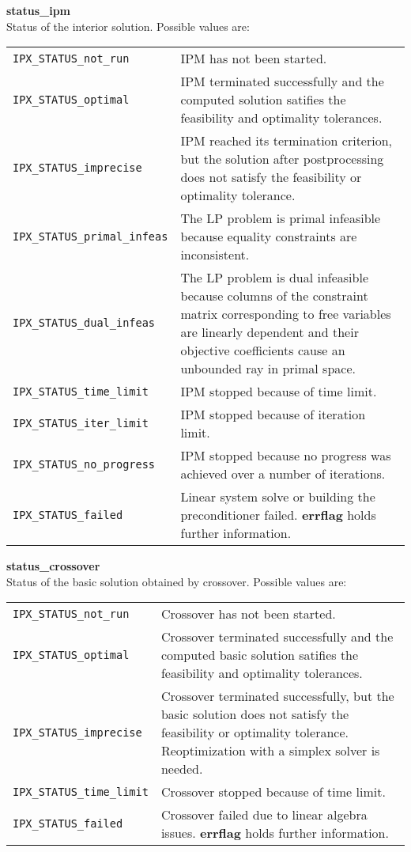 \documentclass{article}
\newcommand{\ct}{\texttt}
\newcommand{\info}[2]{
  \noindent\begin{minipage}{\textwidth}
    \textbf{#1}\\
    #2
  \end{minipage}
  \vskip 1\baselineskip
}
\begin{document}
\info{status\_ipm}{
  Status of the interior solution. Possible values are:\\[1em]
  \begin{tabular}{lp{8cm}}
    \ct{IPX\_STATUS\_not\_run} & IPM has not been started.\\
    \ct{IPX\_STATUS\_optimal} & IPM terminated successfully and the computed
    solution satifies the feasibility and optimality tolerances.\\
    \ct{IPX\_STATUS\_imprecise} & IPM reached its termination criterion, but the
    solution after postprocessing does not satisfy the feasibility or optimality
    tolerance.\\
    \ct{IPX\_STATUS\_primal\_infeas} & The LP problem is primal infeasible
    because equality constraints are inconsistent.\\
    \ct{IPX\_STATUS\_dual\_infeas} & The LP problem is dual infeasible because
    columns of the constraint matrix corresponding to free variables are
    linearly dependent and their objective coefficients cause an unbounded ray
    in primal space.\\
    \ct{IPX\_STATUS\_time\_limit} & IPM stopped because of time limit.\\
    \ct{IPX\_STATUS\_iter\_limit} & IPM stopped because of iteration limit.\\
    \ct{IPX\_STATUS\_no\_progress} & IPM stopped because no progress was
    achieved over a number of iterations.\\
    \ct{IPX\_STATUS\_failed} & Linear system solve or building the
    preconditioner failed. \textbf{errflag} holds further information.\\
  \end{tabular}
}

\info{status\_crossover}{
  Status of the basic solution obtained by crossover. Possible values
  are:\\[1em]
  \begin{tabular}{lp{8cm}}
    \ct{IPX\_STATUS\_not\_run} & Crossover has not been started.\\
    \ct{IPX\_STATUS\_optimal} & Crossover terminated successfully and the
    computed basic solution satifies the feasibility and optimality
    tolerances.\\
    \ct{IPX\_STATUS\_imprecise} & Crossover terminated successfully, but the
    basic solution does not satisfy the feasibility or optimality tolerance.
    Reoptimization with a simplex solver is needed.\\
    \ct{IPX\_STATUS\_time\_limit} & Crossover stopped because of time limit.\\
    \ct{IPX\_STATUS\_failed} & Crossover failed due to linear algebra issues.
    \textbf{errflag} holds further information.\\
  \end{tabular}
}
\end{document}
